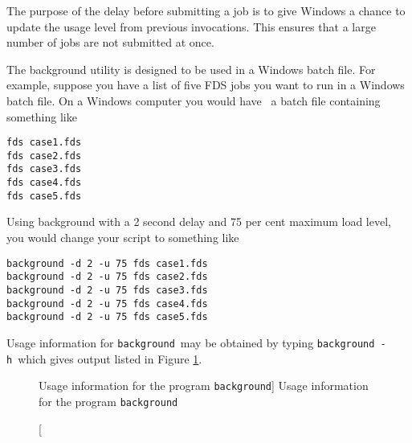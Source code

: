 The purpose of the delay before submitting a job is to give Windows a
chance to update the usage level from 
previous invocations.  This ensures that a
large number of jobs are not
submitted at once.

The background utility is designed to be used in a Windows batch file.
For example, suppose you have
a list of five FDS jobs you want to run in a Windows batch file. On a
Windows computer you would have \
a batch file containing something like

\begin{lstlisting}
fds case1.fds
fds case2.fds
fds case3.fds
fds case4.fds
fds case5.fds
\end{lstlisting}

Using background with a 2 second delay and 75 per cent maximum
load level, you would change your script to something like

\begin{lstlisting}
background -d 2 -u 75 fds case1.fds
background -d 2 -u 75 fds case2.fds
background -d 2 -u 75 fds case3.fds
background -d 2 -u 75 fds case4.fds
background -d 2 -u 75 fds case5.fds
\end{lstlisting}

Usage information for {\tt background}\ may be obtained
by typing {\tt background -h}\ which gives output listed in Figure \ref{fig:background}.

\begin{figure}[bph]
{\small

}
\caption
[Usage information for the program {\tt background}]
{Usage information for the program {\tt background}}
\label{fig:background}%
\end{figure}
